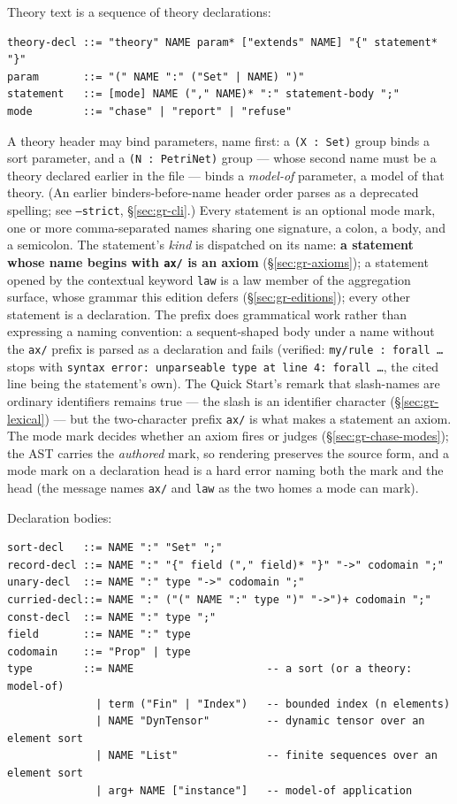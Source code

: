 Theory text is a sequence of theory declarations:

\begin{Verbatim}[fontsize=\small,frame=leftline,rulecolor=\color{accentmid},framesep=3mm,xleftmargin=3mm]
theory-decl ::= "theory" NAME param* ["extends" NAME] "{" statement* "}"
param       ::= "(" NAME ":" ("Set" | NAME) ")"
statement   ::= [mode] NAME ("," NAME)* ":" statement-body ";"
mode        ::= "chase" | "report" | "refuse"
\end{Verbatim}

\noindent A theory header may bind parameters, name first: a
\texttt{(X : Set)} group binds a sort parameter, and a
\texttt{(N : PetriNet)} group --- whose second name must be a theory
declared earlier in the file --- binds a \emph{model-of} parameter,
a model of that theory. (An earlier binders-before-name header order
parses as a deprecated spelling; see \texttt{--strict},
\S\ref{sec:gr-cli}.) Every statement is an optional mode mark, one
or more comma-separated names sharing one signature, a colon, a
body, and a semicolon. The statement's \emph{kind} is dispatched on
its name: \textbf{a statement whose name begins with \texttt{ax/} is
an axiom} (\S\ref{sec:gr-axioms}); a statement opened by the
contextual keyword \texttt{law} is a law member of the aggregation
surface, whose grammar this edition defers
(\S\ref{sec:gr-editions}); every other statement is a declaration.
The prefix does grammatical work rather than expressing
a naming convention: a sequent-shaped body under a name without the
\texttt{ax/} prefix is parsed as a declaration and fails (verified:
\texttt{my/rule : forall …} stops with \texttt{syntax error:
unparseable type at line 4: forall …}, the cited line being the
statement's own). The Quick Start's remark that
slash-names are ordinary identifiers remains true — the slash is an
identifier character (\S\ref{sec:gr-lexical}) — but the two-character
prefix \texttt{ax/} is what makes a statement an axiom. The mode
mark decides whether an axiom fires or judges
(\S\ref{sec:gr-chase-modes}); the AST carries the \emph{authored}
mark, so rendering preserves the source form, and a mode mark on a
declaration head is a hard error naming both the mark and the head
(the message names \texttt{ax/} and \texttt{law} as the two homes a
mode can mark).

Declaration bodies:

\begin{Verbatim}[fontsize=\small,frame=leftline,rulecolor=\color{accentmid},framesep=3mm,xleftmargin=3mm]
sort-decl   ::= NAME ":" "Set" ";"
record-decl ::= NAME ":" "{" field ("," field)* "}" "->" codomain ";"
unary-decl  ::= NAME ":" type "->" codomain ";"
curried-decl::= NAME ":" ("(" NAME ":" type ")" "->")+ codomain ";"
const-decl  ::= NAME ":" type ";"
field       ::= NAME ":" type
codomain    ::= "Prop" | type
type        ::= NAME                     -- a sort (or a theory: model-of)
              | term ("Fin" | "Index")   -- bounded index (n elements)
              | NAME "DynTensor"         -- dynamic tensor over an element sort
              | NAME "List"              -- finite sequences over an element sort
              | arg+ NAME ["instance"]   -- model-of application
\end{Verbatim}

